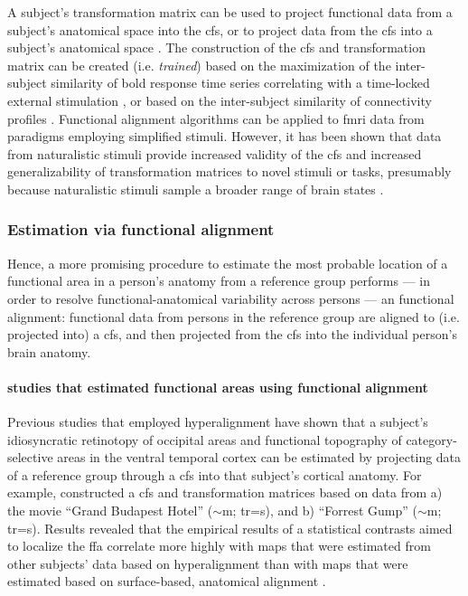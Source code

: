 %
A subject's transformation matrix can be used to project functional data from a
subject's anatomical space into the \ac{cfs}, or to project data from the
\ac{cfs} into a subject's anatomical space \citep{haxby2020hyperalignment}.
%
The construction of the \ac{cfs} and transformation matrix can be created (i.e.
\textit{trained}) based on the maximization of the inter-subject similarity of
\ac{bold} response time series correlating with a time-locked external
stimulation \citep{haxby2011common, chen2015reduced, sabuncu2010function}, or
based on the inter-subject similarity of connectivity profiles
\citep{feilong2018reliable, guntupalli2018computational, nastase2019leveraging}.
%
Functional alignment algorithms can be applied to \ac{fmri} data from paradigms
employing simplified stimuli.
%
However, it has been shown that data from naturalistic stimuli provide increased
validity of the \ac{cfs} and increased generalizability of transformation
matrices to novel stimuli or tasks, presumably because naturalistic stimuli
sample a broader range of brain states \citep{haxby2011common,
guntupalli2016model}.


\subsubsection{Estimation via functional alignment}
%
Hence, a more promising procedure to estimate the most probable location of a
functional area in a person's anatomy from a reference group performs --- in
order to resolve functional-anatomical variability across persons --- an
functional alignment:
%
functional data from persons in the reference group are aligned to (i.e.
projected into) a \ac{cfs}, and then projected from the \ac{cfs} into the
individual person's brain anatomy.


\paragraph{studies that estimated functional areas using functional alignment}

Previous studies \citep{jiahui2020predicting, guntupalli2016model,
haxby2011common} that employed hyperalignment have shown that a subject's
idiosyncratic retinotopy of occipital areas and functional topography of
category-selective areas in the ventral temporal cortex can be estimated by
projecting data of a reference group through a \ac{cfs} into that subject's
cortical anatomy.
For example, \citep{jiahui2020predicting} constructed a \ac{cfs} and
transformation matrices based on data from a) the movie ``Grand Budapest Hotel''
($\sim$\unit[50]{m}; \ac{tr}=\unit[1]{s}), and b) ``Forrest Gump''
($\sim$\unit[120]{m}; \ac{tr}=\unit[2]{s}).
Results revealed that the empirical results of a statistical contrasts aimed to
localize the \ac{ffa} correlate more highly with maps that were estimated from
other subjects' data based on hyperalignment than with maps that were estimated
based on surface-based, anatomical alignment \citep{jiahui2020predicting}.


